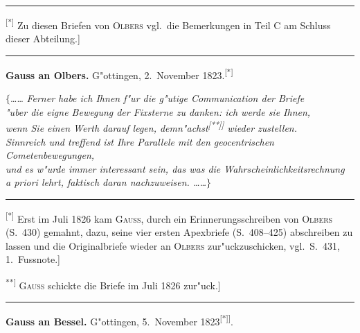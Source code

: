 \documentclass[12pt,a4paper]{article}
\theoremstyle{plain}
\theoremstyle{definition}
\theoremstyle{remark}
\begin{document}
\rule{\textwidth}{0.4pt}
{\small
\textsuperscript{[*]} Zu diesen Briefen von \textsc{Olbers} vgl.\ die Bemerkungen in Teil C am Schluss dieser Abteilung.]
}
\rule{\textwidth}{0.4pt}

\vspace{1em}
\begin{center}
\textbf{Gauss an Olbers.} \quad G"ottingen, 2.\ November 1823.\textsuperscript{[*]}
\end{center}

\noindent
$\{$\ldots{}\ldots{} {\itshape Ferner habe ich Ihnen f"ur die g"utige Communication der Briefe} \\ {\itshape "uber die eigne Bewegung der Fixsterne zu danken: ich werde sie Ihnen,} \\ {\itshape wenn Sie einen Werth darauf legen, demn"achst\textsuperscript{[**]]} wieder zustellen.} \\ {\itshape Sinnreich und treffend ist Ihre Parallele mit den geocentrischen Cometenbewegungen,} \\ {\itshape und es w"urde immer interessant sein, das was die Wahrscheinlichkeitsrechnung} \\ {\itshape a priori lehrt, faktisch daran nachzuweisen. \ldots{}\ldots{}$\}$}

\rule{\textwidth}{0.4pt}
{\small
\textsuperscript{[*]} Erst im Juli 1826 kam \textsc{Gauss}, durch ein Erinnerungsschreiben von \textsc{Olbers} (S.\ 430) gemahnt, dazu, seine vier ersten Apexbriefe (S.\ 408--425) abschreiben zu lassen und die Originalbriefe wieder an \textsc{Olbers} zur"uckzuschicken, vgl.\ S.\ 431, 1.\ Fussnote.]

\textsuperscript{**]} \textsc{Gauss} schickte die Briefe im Juli 1826 zur"uck.]
}
\rule{\textwidth}{0.4pt}

\vspace{1em}
\begin{center}
\textbf{Gauss an Bessel.} \quad G"ottingen, 5.\ November 1823\textsuperscript{[*]]}.
\end{center}
\end{document}
